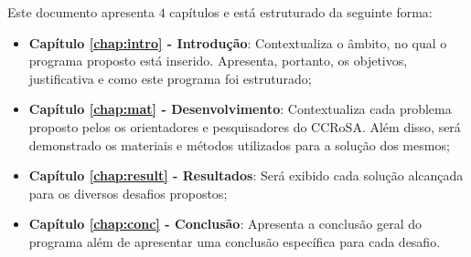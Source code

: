 Este documento apresenta $4$ capítulos e está estruturado da seguinte forma:

\begin{itemize}

  \item \textbf{Capítulo \ref{chap:intro} - Introdução}: Contextualiza o âmbito, no qual o programa proposto está inserido. Apresenta, portanto, os objetivos, justificativa e como este programa foi estruturado;
  \item \textbf{Capítulo \ref{chap:mat} - Desenvolvimento}: Contextualiza cada problema proposto pelos os orientadores e pesquisadores do CCRoSA. Além disso, será demonstrado os materiais e métodos utilizados para a solução dos mesmos;
  \item \textbf{Capítulo \ref{chap:result} - Resultados}: Será exibido cada solução alcançada para os diversos desafios propostos;
  \item \textbf{Capítulo \ref{chap:conc} - Conclusão}: Apresenta a conclusão geral do programa além de apresentar uma conclusão específica para cada desafio.

\end{itemize}
